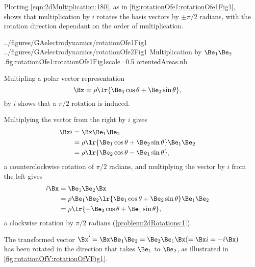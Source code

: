 %
%

Plotting \cref{eqn:2dMultiplication:180}, as in
\cref{fig:rotationOfe1:rotationOfe1Fig1},
 shows that multiplication by \( i \) rotates the  basis vectors by \( \pm \pi/2 \) radians,
with the
rotation direction dependant on the order of multiplication.

\mathImageTwoFigures
{../figures/GAelectrodynamics/rotationOfe1Fig1}
{../figures/GAelectrodynamics/rotationOfe2Fig1}
{Multiplication by \( \Be_1 \Be_2 \).}{fig:rotationOfe1:rotationOfe1Fig1}{scale=0.5}
{orientedAreas.nb}

Multipling a polar vector representation
\begin{equation}\label{eqn:2dRotations:280}
   \Bx = \rho \lr{ \Be_1 \cos\theta + \Be_2 \sin\theta },
\end{equation}
by \( i \) shows that a \( \pi/2 \) rotation is induced.

Multiplying the vector from the right by \( i \) gives
\begin{equation}\label{eqn:2dRotations:300}
\begin{aligned}
\Bx i
&= \Bx \Be_1 \Be_2 \\
&= \rho \lr{ \Be_1 \cos\theta + \Be_2 \sin\theta } \Be_1 \Be_2 \\
&= \rho \lr{ \Be_2 \cos\theta - \Be_1 \sin\theta },
\end{aligned}
\end{equation}
a counterclockwise rotation of \( \pi/2 \) radians, and
multiplying the vector by \( i \) from the left gives
\begin{equation}\label{eqn:2dRotations:3}
\begin{aligned}
i \Bx
&= \Be_1 \Be_2 \Bx \\
&= \rho \Be_1 \Be_2 \lr{ \Be_1 \cos\theta + \Be_2 \sin\theta } \Be_1 \Be_2 \\
&= \rho \lr{ -\Be_2 \cos\theta + \Be_1 \sin\theta },
\end{aligned}
\end{equation}
a clockwise rotation by \( \pi/2 \) radians
(\cref{problem:2dRotations:1}).

The transformed vector \( \Bx' = \Bx \Be_1 \Be_2 = \Be_2 \Be_1 \Bx (=\Bx i = -i \Bx) \) has been rotated in the direction that takes \( \Be_1 \) to \( \Be_2 \), as illustrated
in \cref{fig:rotationOfV:rotationOfVFig1}.


